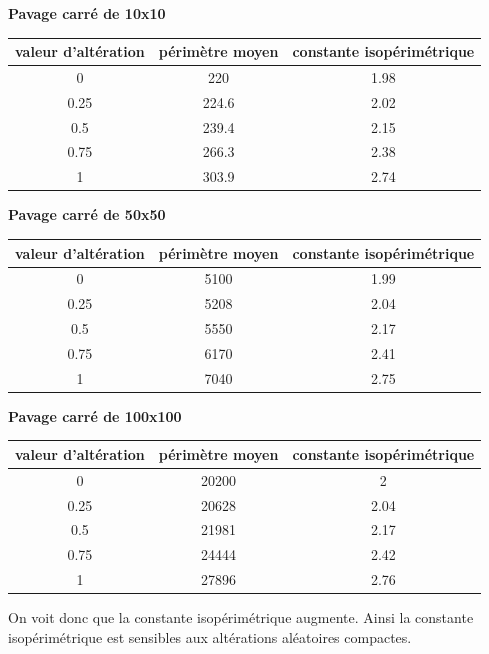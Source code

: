 \documentclass{book}
\begin{document}
\begin{table}[H][Résultats]
\centering
\textbf{Pavage carré de 10x10} \\

\begin{tabular}{|c|c|c|}
  \hline
  valeur d'altération & périmètre moyen & constante isopérimétrique \\
  \hline
  0 & 220 & 1.98\\
  0.25 & 224.6 & 2.02\\
  0.5 & 239.4 & 2.15\\
  0.75 & 266.3 & 2.38\\
  1 & 303.9 & 2.74\\
  \hline
\end{tabular}

\newline
\textbf{Pavage carré de 50x50} \\

\begin{tabular}{|c|c|c|}
  
  \hline
  valeur d'altération & périmètre moyen & constante isopérimétrique \\
  \hline
  0 & 5100 & 1.99\\
  0.25 & 5208 & 2.04\\
  0.5 & 5550 & 2.17\\
  0.75 & 6170 & 2.41\\
  1 & 7040 & 2.75\\
  \hline

\end{tabular}

\newline
\textbf{Pavage carré de 100x100} \\

\begin{tabular}{|c|c|c|}
  \hline
  valeur d'altération & périmètre moyen & constante isopérimétrique \\
  \hline
  0 & 20200 & 2\\
  0.25 & 20628 & 2.04\\
  0.5 & 21981 & 2.17\\
  0.75 & 24444 & 2.42\\
  1 & 27896 & 2.76\\
  \hline
\end{tabular}
\end{table}

{\noindent On voit donc que la constante isopérimétrique augmente. Ainsi la constante isopérimétrique est sensibles aux altérations aléatoires compactes.}
\end{document}
